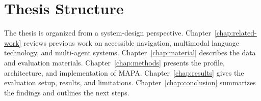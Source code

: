 \documentclass[../CLthesis.tex]{subfiles}
\begin{document}
\section{Thesis Structure}
The thesis is organized from a system-design perspective. Chapter~\ref{chap:related-work} reviews previous work on accessible navigation, multimodal language technology, and multi-agent systems. Chapter~\ref{chap:material} describes the data and evaluation materials. Chapter~\ref{chap:methods} presents the profile, architecture, and implementation of MAPA. Chapter~\ref{chap:results} gives the evaluation setup, results, and limitations. Chapter~\ref{chap:conclusion} summarizes the findings and outlines the next steps.




\end{document}

